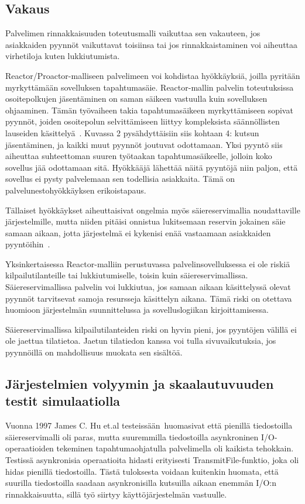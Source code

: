 \documentclass[finnish]{tktltiki2}
\theoremstyle{definition}
\theoremstyle{remark}
\begin{document}
\subsection{Vakaus}
Palvelimen rinnakkaisuuden toteutusmalli vaikuttaa sen vakauteen, jos asiakkaiden
pyynnöt vaikuttavat toisiinsa tai jos rinnakkaistaminen voi aiheuttaa virhetiloja kuten
lukkiutumista.

Reactor/Proactor-malliseen palvelimeen voi kohdistaa hyökkäyksiä, joilla pyritään
myrkyttämään sovelluksen tapahtumasäie. Reactor-mallin palvelin toteutuksissa
osoitepolkujen jäsentäminen on saman säikeen vastuulla kuin sovelluksen ohjaaminen.
Tämän työvaiheen takia
tapahtumasäikeen myrkyttämiseen sopivat pyynnöt,
joiden osoitepolun selvittämiseen liittyy kompleksista
säännöllisten lauseiden käsittelyä~\cite{davis_case_2017}.
Kuvassa 2 pysähdyttäisiin siis kohtaan 4: kutsun jäsentäminen, ja
kaikki muut pyynnöt joutuvat odottamaan.
Yksi pyyntö siis aiheuttaa suhteettoman suuren työtaakan 
tapahtumasäikeelle, jolloin koko sovellus jää odottamaan sitä.
Hyökkääjä lähettää näitä pyyntöjä niin paljon, että sovellus 
ei pysty palvelemaan sen todellisia asiakkaita. Tämä
on palvelunestohyökkäyksen erikoistapaus.

Tällaiset hyökkäykset aiheuttaisivat ongelmia myös säiereservimallia
noudattaville järjestelmille, mutta niiden pitäisi onnistua
lukitsemaan reservin jokainen säie samaan aikaan, jotta
järjestelmä ei kykenisi enää vastaamaan asiakkaiden pyyntöihin~\cite{davis_case_2017}.

Yksinkertaisessa Reactor-malliin perustuvassa palvelinsovelluksessa ei ole 
riskiä kilpailutilanteille tai lukkiutumiselle, toisin kuin säiereservimallissa.
Säiereservimallissa palvelin voi lukkiutua, jos samaan aikaan käsittelyssä olevat
pyynnöt tarvitsevat samoja resursseja käsittelyn aikana. Tämä riski on otettava
huomioon järjestelmän suunnittelussa ja sovelluslogiikan kirjoittamisessa.

Säiereservimallissa kilpailutilanteiden riski on hyvin pieni, jos pyyntöjen
välillä ei ole jaettua tilatietoa. Jaetun tilatiedon kanssa voi tulla
sivuvaikutuksia, jos pyynnöillä on mahdollisuus muokata sen sisältöä.

\subsection{Järjestelmien volyymin ja skaalautuvuuden testit simulaatiolla}
Vuonna 1997 James C. Hu et.al testeissään~\cite{hu_measuring_1997}huomasivat
että pienillä tiedostoilla säiereservimalli oli paras,
mutta suuremmilla tiedostoilla asynkroninen I/O-operaatioiden
tekeminen tapahtumaohjatulla palvelimella oli kaikista tehokkain.
Testissä asynkronisia operaatioita hidasti
erityisesti TransmitFile-funktio, joka oli
hidas pienillä tiedostoilla.
Tästä tuloksesta voidaan kuitenkin huomata,
että suurilla tiedostoilla saadaan asynkronisilla
kutsuilla aikaan enemmän I/O:n rinnakkaisuutta, sillä
työ siirtyy käyttöjärjestelmän vastuulle.
\end{document}
